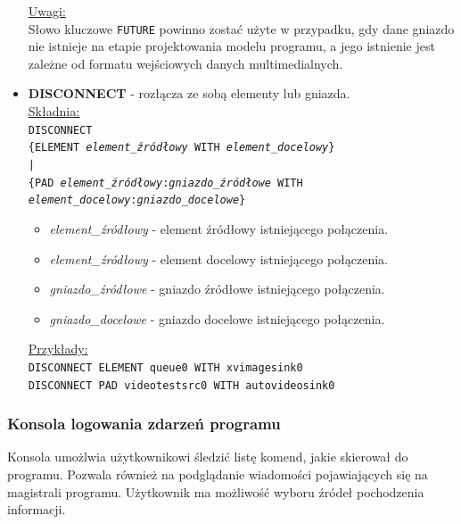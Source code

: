 \documentclass[12pt]{article}
\begin{document}
\begin{itemize}
\underline{Uwagi:} \\
Słowo kluczowe \texttt{FUTURE} powinno zostać użyte w przypadku, gdy dane gniazdo nie istnieje na etapie projektowania modelu programu, a jego istnienie jest zależne od formatu wejściowych danych multimedialnych.
\cleardoublepage
\item \textbf{DISCONNECT} - rozłącza ze sobą elementy lub gniazda. \\
\underline{Składnia:} \\
\texttt{DISCONNECT \\
\hspace*{2em} \{ELEMENT \textit{element\_źródłowy} WITH \textit{element\_docelowy}\} \\
\hspace*{2em} | \\
\hspace*{2em} \{PAD \textit{element\_źródłowy}:\textit{gniazdo\_źródłowe} WITH \\
\hspace*{4em} \textit{element\_docelowy}:\textit{gniazdo\_docelowe}\}
}
\begin{itemize}
 \setlength{\itemsep}{0em}
\item \textit{element\_źródłowy} - element źródłowy istniejącego połączenia.
\item \textit{element\_źródłowy} - element docelowy istniejącego połączenia.
\item \textit{gniazdo\_źródłowe} - gniazdo źródłowe istniejącego połączenia.
\item \textit{gniazdo\_docelowe} - gniazdo docelowe istniejącego połączenia.
\end{itemize}
\underline{Przykłady:} \\
\texttt{DISCONNECT ELEMENT queue0 WITH xvimagesink0} \\
\texttt{DISCONNECT PAD videotestsrc0 WITH autovideosink0}
\end{itemize}
\subsubsection{Konsola logowania zdarzeń programu}
Konsola umożlwia użytkownikowi śledzić listę komend, jakie skierował do programu. Pozwala również na podglądanie wiadomości pojawiających się na magistrali programu. Użytkownik ma możliwość wyboru źródeł pochodzenia informacji.
\end{document}
